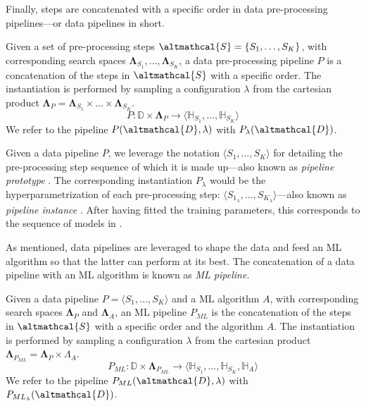 Finally, steps are concatenated with a specific order in data pre-processing pipelines---or data pipelines in short.

\begin{definition}
    \label{background-def:data_pipeline}
    Given a set of pre-processing steps $\altmathcal{S} = \{S_1,\dots, S_{K}\}$, with corresponding search spaces $\pmb{\Lambda}_{S_1}, \dots, \pmb{\Lambda}_{S_K}$, a data pre-processing pipeline $P$ is a concatenation of the steps in $\altmathcal{S}$ with a specific order.
    The instantiation is performed by sampling a configuration $\lambda$ from the cartesian product $\pmb{\Lambda}_P  = \pmb{\Lambda}_{S_1} \times \dots \times \pmb{\Lambda}_{S_K}$.
    \begin{equation*}
        P: \mathbb{D} \times \pmb{\Lambda}_P \rightarrow \langle \mathbb{H}_{S_1}, \dots,  \mathbb{H}_{S_K} \rangle
    \end{equation*}
   We refer to the pipeline $P(\altmathcal{D}, \lambda)$ with $P_{\lambda}(\altmathcal{D})$.
\end{definition}

Given a data pipeline $P$, we leverage the notation $\langle S_1, \dots, S_K \rangle$ for detailing the pre-processing step sequence of which it is made up---also known as \textit{pipeline prototype} \cite{quemy2019data}.
The corresponding instantiation $P_{\lambda}$ would be the hyperparametrization of each pre-processing step: $\langle S_{1_{\lambda}}, \dots, S_{K_{\lambda}} \rangle$---also known as \textit{pipeline instance} \cite{quemy2019data}.
After having fitted the training parameters, this corresponds to the sequence of models in .

As mentioned, data pipelines are leveraged to shape the data and feed an ML algorithm so that the latter can perform at its best.
The concatenation of a data pipeline with an ML algorithm is known as \textit{ML pipeline}.

\begin{definition}
    Given a data pipeline $P = \langle S_1,\dots, S_{K} \rangle$ and a ML algorithm $A$, with corresponding search spaces $\pmb{\Lambda}_{P}$ and $\pmb{\Lambda}_{A}$, an ML pipeline $P_{ML}$ is the concatenation of the steps in $\altmathcal{S}$ with a specific order and the algorithm $A$.
    The instantiation is performed by sampling a configuration $\lambda$ from the cartesian product  $\pmb{\Lambda}_{P_{ML}}  = \pmb{\Lambda}_{P} \times {\Lambda}_{A}$.
    \begin{equation*}
        P_{ML}: \mathbb{D} \times \pmb{\Lambda}_{P_{ML}} \rightarrow \langle \mathbb{H}_{S_1}, \dots,  \mathbb{H}_{S_K}, \mathbb{H}_{A} \rangle
    \end{equation*}
   We refer to the pipeline $P_{ML}(\altmathcal{D}, \lambda)$ with $P_{ML_{\lambda}}(\altmathcal{D})$.
\end{definition}

